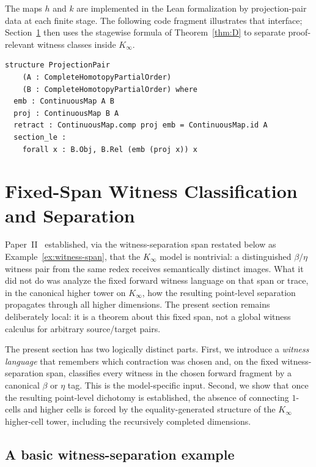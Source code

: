 \documentclass[webpdf,traditional,large,numbered]{oup-authoring-template}
\theoremstyle{thmstyleone}%
\theoremstyle{thmstyletwo}%
\theoremstyle{thmstylethree}%
\newcommand{\Kinf}{K_\infty}
\begin{document}
The maps $h$ and $k$ are implemented in the Lean formalization by projection-pair
data at each finite stage.  The following code fragment illustrates that
interface; Section~\ref{sec:witness} then uses the stagewise formula of
Theorem~\ref{thm:D} to separate proof-relevant witness classes inside $\Kinf$.

\begin{lstlisting}[caption={Projection pairs for the $K_n$ tower
  (from \texttt{KInfinity/Construction.lean}).}]
structure ProjectionPair
    (A : CompleteHomotopyPartialOrder)
    (B : CompleteHomotopyPartialOrder) where
  emb : ContinuousMap A B
  proj : ContinuousMap B A
  retract : ContinuousMap.comp proj emb = ContinuousMap.id A
  section_le :
    forall x : B.Obj, B.Rel (emb (proj x)) x
\end{lstlisting}

\section{Fixed-Span Witness Classification and Separation}\label{sec:witness}

Paper~II~\cite{MRdQ:Kinfinity} established, via the witness-separation span
restated below as Example~\ref{ex:witness-span}, that the $\Kinf$
model is nontrivial: a distinguished $\beta/\eta$ witness pair from the same
redex receives semantically distinct images.  What it did not do was analyze
the fixed forward witness language on that span or trace, in the canonical
higher tower on $\Kinf$, how the resulting point-level separation propagates
through all higher dimensions.  The present section remains deliberately local:
it is a theorem about this fixed span, not a global witness calculus for
arbitrary source/target pairs.

The present section has two logically distinct parts.  First, we introduce a
\emph{witness language} that remembers which contraction was chosen and, on the
fixed witness-separation span, classifies every witness in the chosen forward
fragment by a canonical $\beta$ or $\eta$ tag.  This is the model-specific
input.  Second, we show that once the
resulting point-level dichotomy is established, the absence of connecting
$1$-cells and higher cells is forced by the equality-generated structure of the
$\Kinf$ higher-cell tower, including the recursively completed dimensions.

\subsection{A basic witness-separation example}
\end{document}
